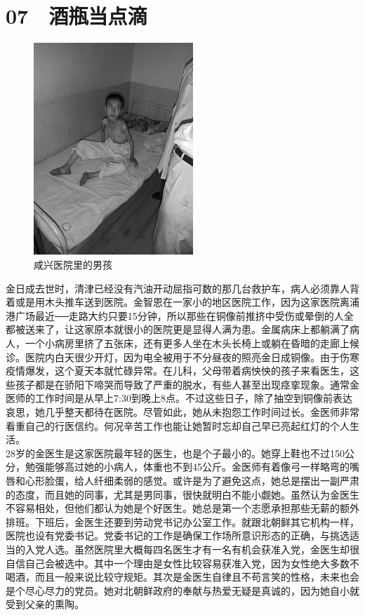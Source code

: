 \fancyhead[RO]{\thepage}
\fancyhead[LE]{\thepage}
\fancyfoot[LE,RO]{}
\fancyfoot[LO,CE]{}
\fancyfoot[CO,RE]{}
\chapter*{07 {\FA } 酒瓶当点滴}
\begin{figure}[!htbp]
	\centering
	\includegraphics[width=6cm]{./Chapters/Images/07.jpg}
	\caption*{咸兴医院里的男孩}
\end{figure}


金日成去世时，清津已经没有汽油开动屈指可数的那几台救护车，病人必须靠人背着或是用木头推车送到医院。金智恩在一家小的地区医院工作，因为这家医院离浦港广场最近──走路大约只要15分钟，所以那些在铜像前推挤中受伤或晕倒的人全都被送来了，让这家原本就很小的医院更是显得人满为患。金属病床上都躺满了病人，一个小病房里挤了五张床，还有更多人坐在木头长椅上或躺在昏暗的走廊上候诊。医院内白天很少开灯，因为电全被用于不分昼夜的照亮金日成铜像。由于伤寒疫情爆发，这个夏天本就忙碌异常。在儿科，父母带着病怏怏的孩子来看医生，这些孩子都是在骄阳下啼哭而导致了严重的脱水，有些人甚至出现痉挛现象。通常金医师的工作时间是从早上7:30到晚上8点。不过这些日子，除了抽空到铜像前表达哀思，她几乎整天都待在医院。尽管如此，她从未抱怨工作时间过长。金医师非常看重自己的行医信约。何况辛苦工作也能让她暂时忘却自己早已亮起红灯的个人生活。\\

28岁的金医生是这家医院最年轻的医生，也是个子最小的。她穿上鞋也不过150公分，勉强能够高过她的小病人，体重也不到45公斤。金医师有着像弓一样略弯的嘴唇和心形脸蛋，给人纤细柔弱的感觉。或许是为了避免这点，她总是摆出一副严肃的态度，而且她的同事，尤其是男同事，很快就明白不能小觑她。虽然认为金医生不容易相处，但他们都认为她是个好医生。她总是第一个志愿承担那些无薪的额外排班。下班后，金医生还要到劳动党书记办公室工作。就跟北朝鲜其它机构一样，医院也设有党委书记。党委书记的工作是确保工作场所意识形态的正确，与挑选适当的入党人选。虽然医院里大概每四名医生才有一名有机会获准入党，金医生却很自信自己会被选中。其中一个理由是女性比较容易获准入党，因为女性绝大多数不喝酒，而且一般来说比较守规矩。其次是金医生自律且不苟言笑的性格，未来也会是个尽心尽力的党员。她对北朝鲜政府的奉献与热爱无疑是真诚的，因为她自小就受到父亲的熏陶。\\

